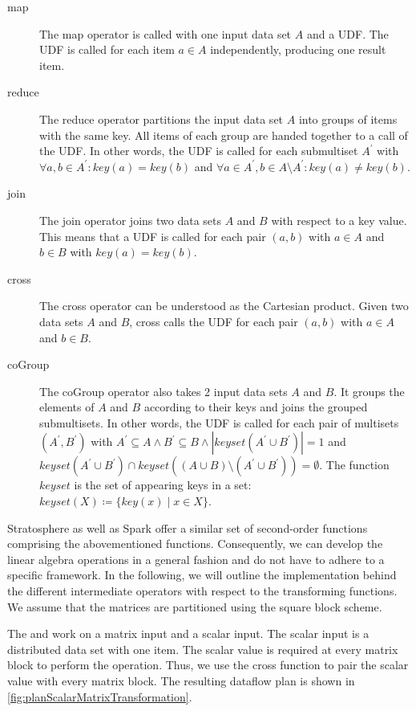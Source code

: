\begin{description}
	\item[map] The map operator is called with one input data set $A$ and a UDF. The UDF is called for each item $a\in A$ independently, producing one result item.

	\item[reduce] The reduce operator partitions the input data set $A$ into groups of items with the same key. 
		All items of each group are handed together to a call of the UDF.
		In other words, the UDF is called for each submultiset $A^\prime$ with $\forall a,b\in A^\prime : key(a) = key(b)$ and $\forall a \in A^\prime, b\in A \setminus A^\prime: key(a) \not = key(b)$.

	\item[join] The join operator joins two data sets $A$ and $B$ with respect to a key value.
		This means that a UDF is called for each pair $(a,b)$ with $a\in A$ and $b\in B$ with $key(a)=key(b)$.

	\item[cross]The cross operator can be understood as the Cartesian product.
		Given two data sets $A$ and $B$, cross calls the UDF for each pair $(a,b)$ with $a\in A$ and $b\in B$.
	\item[coGroup] The coGroup operator also takes 2 input data sets $A$ and $B$.
		It groups the elements of $A$ and $B$ according to their keys and joins the grouped submultisets.
		In other words, the UDF is called for each pair of multisets $(A^\prime, B^\prime)$ with $A^\prime \subseteq A \wedge B^\prime \subseteq B \wedge |keyset(A^\prime \cup B^\prime)| = 1$ and $keyset(A^\prime \cup B^\prime) \cap keyset((A \cup B) \setminus (A^\prime \cup B^\prime)) = \emptyset$.
		The function $keyset$ is the set of appearing keys in a set: $keyset(X) \coloneqq \{ key(x) \mid x \in X \}$.
\end{description}

Stratosphere as well as Spark offer a similar set of second-order functions comprising the abovementioned functions.
Consequently, we can develop the linear algebra operations in a general fashion and do not have to adhere to a specific framework.
In the following, we will outline the implementation behind the different intermediate operators with respect to the transforming functions.
We assume that the matrices are partitioned using the square block scheme.

The  and  work on a matrix input and a scalar input.
The scalar input is a distributed data set with one item.
The scalar value is required at every matrix block to perform the  operation.
Thus, we use the cross function to pair the scalar value with every matrix block.
The resulting dataflow plan is shown in \cref{fig:planScalarMatrixTransformation}.

